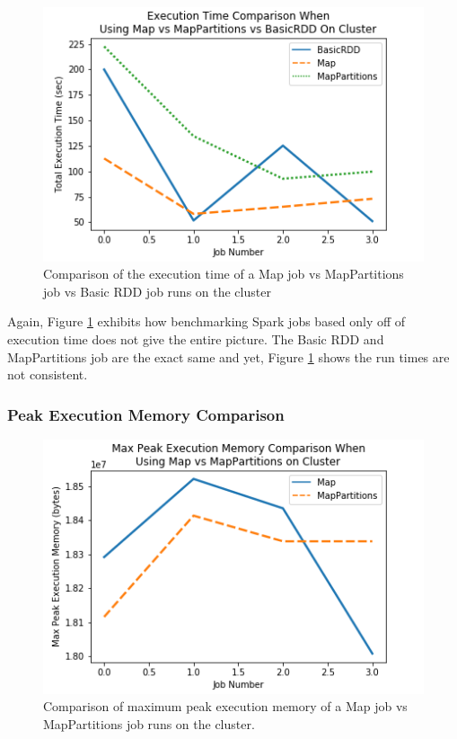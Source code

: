 \documentclass[conference]{IEEEtran}
\begin{document}
\begin{figure}
    \includegraphics[width=\linewidth]{../python_scripts/images/mapVsMapPartitionsAllExecutionTimeCluster.png}
    \caption{Comparison of the execution time of a Map job vs MapPartitions job vs Basic RDD job runs on the cluster}
    \label{fig:mapVMapPartitionsAllExecTimeCluster}
\end{figure}

Again, Figure \ref{fig:mapVMapPartitionsAllExecTimeCluster} exhibits how benchmarking Spark jobs based only off of execution time does not give the entire picture.
The Basic RDD and MapPartitions job are the exact same and yet, Figure \ref{fig:mapVMapPartitionsAllExecTimeCluster} shows the run times are not consistent.


\subsubsection{Peak Execution Memory Comparison}
\begin{figure}
    \includegraphics[width=\linewidth]{../python_scripts/images/mapVsMapPartitionsMaxPeakExecutionMemoryCluster.png}
    \caption{Comparison of maximum peak execution memory of a Map job vs MapPartitions job runs on the cluster.}
    \label{fig:mapVMapPartitionsMaxPeakExecutionMemoryCluster}
\end{figure}
\end{document}
